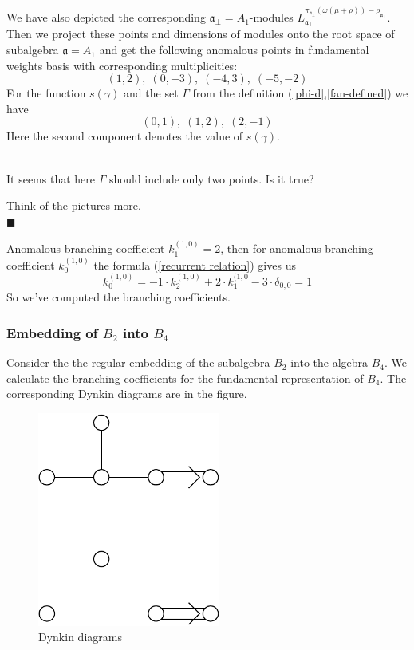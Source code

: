 \documentclass[a4paper,12pt]{article}
\theoremstyle{definition} \newtheorem{Def}{Definition}
\newenvironment{comment}
{\par\noindent{\bf TODO}\\}
{\\\hfill$\scriptstyle\blacksquare$\par}
\begin{document}
We have also depicted the corresponding $\mathfrak{a}_{\bot}=A_1$-modules $L^{\pi_{\mathfrak{a}_{\bot}}(\omega(\mu+\rho))-\rho_{\mathfrak{a}_{\bot}}}_{\mathfrak{a}_{\bot}}$.
Then we project these points and dimensions of modules onto the root space of subalgebra $\mathfrak{a}=A_1$ and get the following anomalous points in fundamental weights basis with corresponding multiplicities:
\begin{equation}
  \label{eq:25}
  (1,2),\; (0,-3),\; (-4,3),\; (-5,-2)
\end{equation}
For the function $s(\gamma)$ and the set $\Gamma$ from the definition (\ref{phi-d},\ref{fan-defined}) we have
\begin{equation}
  \label{eq:22}
  (0,1),\; (1,2),\; (2,-1)
\end{equation}
Here the second component denotes the value of $s(\gamma)$.
\begin{comment}
  It seems that here $\Gamma$ should include only two points. Is it true?

  Think of the pictures more.
\end{comment}
Anomalous branching coefficient $k^{(1,0)}_{1}=2$, then for anomalous branching coefficient $k^{(1,0)}_{0}$ the formula (\ref{recurrent relation}) gives us
\begin{equation}
  \label{eq:23}
  k^{(1,0)}_{0}=-1\cdot k^{(1,0)}_2 +2\cdot k^{(1,0}_1 - 3\cdot \delta_{0,0} = 1
\end{equation}
So we've computed the branching coefficients.
\subsubsection{Embedding of $B_2$ into $B_4$}
\label{sec:someth-high-dimens}
Consider the the regular embedding of the subalgebra $B_2$ into the algebra $B_4$.
We calculate the branching coefficients for the fundamental representation of $B_4$.
The corresponding Dynkin diagrams are in the figure.
\begin{figure}[ph]
  \centering
  \includegraphics[width=60mm]{B4_B2_2A1.pdf}
  \caption{Dynkin diagrams}
  \label{fig:dynkin}
\end{figure}
\end{document}
